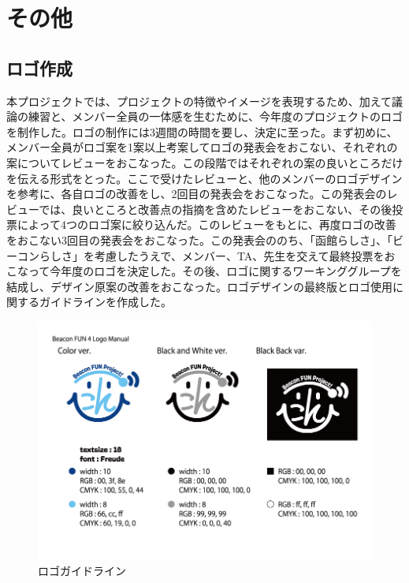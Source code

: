 \section{その他}
\subsection{ロゴ作成}
本プロジェクトでは、プロジェクトの特徴やイメージを表現するため、加えて議論の練習と、メンバー全員の一体感を生むために、今年度のプロジェクトのロゴを制作した。ロゴの制作には3週間の時間を要し、決定に至った。まず初めに、メンバー全員がロゴ案を1案以上考案してロゴの発表会をおこない、それぞれの案についてレビューをおこなった。この段階ではそれぞれの案の良いところだけを伝える形式をとった。ここで受けたレビューと、他のメンバーのロゴデザインを参考に、各自ロゴの改善をし、2回目の発表会をおこなった。この発表会のレビューでは、良いところと改善点の指摘を含めたレビューをおこない、その後投票によって4つのロゴ案に絞り込んだ。このレビューをもとに、再度ロゴの改善をおこない3回目の発表会をおこなった。この発表会ののち、「函館らしさ」、「ビーコンらしさ」を考慮したうえで、メンバー、TA、先生を交えて最終投票をおこなって今年度のロゴを決定した。その後、ロゴに関するワーキンググループを結成し、デザイン原案の改善をおこなった。ロゴデザインの最終版とロゴ使用に関するガイドラインを作成した。

\begin{figure}[htbp]
    \begin{center}
    \includegraphics[width=14cm]{images/BeaconFUN4Logo_Manual.png}
    \end{center}
    \caption{ロゴガイドライン}
    \label{fig:LogoManual}
\end{figure}

